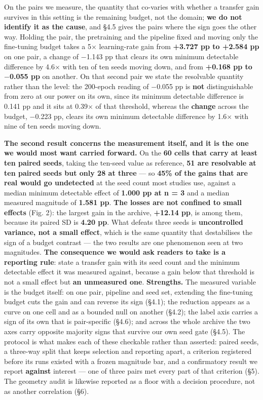 \documentclass[pdflatex,sn-mathphys-ay]{sn-jnl}
\begin{document}
On the pairs we measure, the quantity that co-varies with whether a transfer gain survives in this setting is the remaining budget, not the domain; \textbf{we do not identify it as the cause}, and \S{}4.5 gives the pairs where the sign goes the other way. Holding the pair, the pretraining and the pipeline fixed and moving only the fine-tuning budget takes a 5\ensuremath{\times} learning-rate gain from \textbf{+3.727 pp to +2.584 pp} on one pair, a change of \ensuremath{-}1.143 pp that clears its own minimum detectable difference by 4.6\ensuremath{\times} with ten of ten seeds moving down, and from \textbf{+0.168 pp to $-$0.055 pp} on another. On that second pair we state the resolvable quantity rather than the level: the 200-epoch reading of \ensuremath{-}0.055 pp is \textbf{not} distinguishable from zero at our power on its own, since its minimum detectable difference is 0.141 pp and it sits at 0.39\ensuremath{\times} of that threshold, whereas the \textbf{change} across the budget, \ensuremath{-}0.223 pp, clears its own minimum detectable difference by 1.6\ensuremath{\times} with nine of ten seeds moving down.

\textbf{The second result concerns the measurement itself, and it is the one we would most want carried forward.} On the \textbf{60 cells that carry at least ten paired seeds}, taking the ten-seed value as reference, \textbf{51 are resolvable at ten paired seeds but only 28 at three} --- so \textbf{45\% of the gains that are real would go undetected} at the seed count most studies use, against a median minimum detectable effect of \textbf{1.000 pp at n = 3} and a median measured magnitude of \textbf{1.581 pp}. \textbf{The losses are not confined to small effects} (Fig. 2): the largest gain in the archive, \textbf{+12.14 pp}, is among them, because its paired SD is \textbf{4.20 pp}. What defeats three seeds is \textbf{uncontrolled variance, not a small effect}, which is the same quantity that destabilises the sign of a budget contrast --- the two results are one phenomenon seen at two magnitudes. \textbf{The consequence we would ask readers to take is a reporting rule}: state a transfer gain with its seed count and the minimum detectable effect it was measured against, because a gain below that threshold is not a small effect but \textbf{an unmeasured one}. \textbf{Strengths.} The measured variable is the budget itself: on one pair, pipeline and seed set, extending the fine-tuning budget cuts the gain and can reverse its sign (\S{}4.1); the reduction appears as a curve on one cell and as a bounded null on another (\S{}4.2); the label axis carries a sign of its own that is pair-specific (\S{}4.6); and across the whole archive the two axes carry opposite majority signs that survive our own seed gate (\S{}4.5). The protocol is what makes each of these checkable rather than asserted: paired seeds, a three-way split that keeps selection and reporting apart, a criterion registered before its runs existed with a frozen magnitude bar, and a confirmatory result we report \textbf{against} interest --- one of three pairs met every part of that criterion (\S{}5). The geometry audit is likewise reported as a floor with a decision procedure, not as another correlation (\S{}6).
\end{document}
